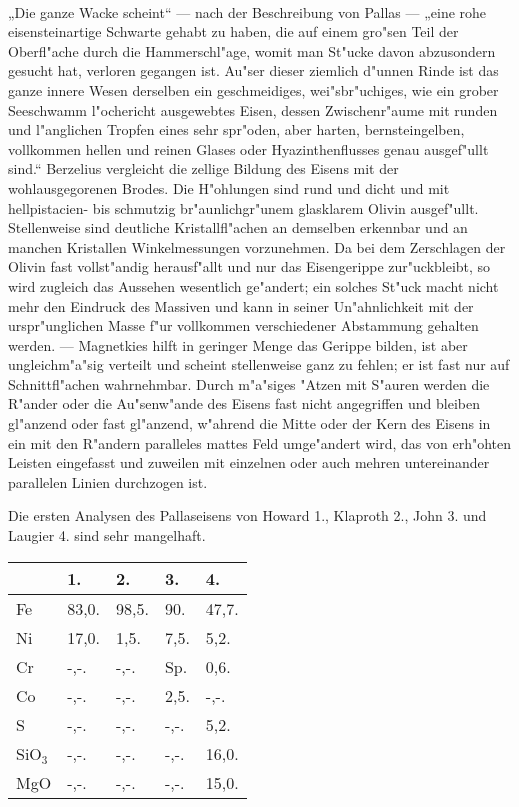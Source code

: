 \documentclass[a4paper, 11pt, oneside]{article}
\begin{document}
\paragraph{}
„Die ganze Wacke scheint“ --- nach der Beschreibung von Pallas --- „eine rohe eisensteinartige Schwarte gehabt zu haben, die auf einem gro"sen Teil der Oberfl"ache durch die Hammerschl"age, womit man St"ucke davon abzusondern gesucht hat, verloren gegangen ist. Au"ser dieser ziemlich d"unnen Rinde ist das ganze innere Wesen derselben ein geschmeidiges, wei"sbr"uchiges, wie ein grober Seeschwamm l"ochericht ausgewebtes Eisen, dessen Zwischenr"aume mit runden und l"anglichen Tropfen eines sehr spr"oden, aber harten, bernsteingelben, vollkommen hellen und reinen Glases oder Hyazinthenflusses genau ausgef"ullt sind.“ Berzelius vergleicht die zellige Bildung des Eisens mit der wohlausgegorenen Brodes. Die H"ohlungen sind rund und dicht und mit hellpistacien- bis schmutzig br"aunlichgr"unem glasklarem Olivin ausgef"ullt. Stellenweise sind deutliche Kristallfl"achen an demselben erkennbar und an manchen Kristallen Winkelmessungen vorzunehmen. Da bei dem Zerschlagen der Olivin fast vollst"andig herausf"allt und nur das Eisengerippe zur"uckbleibt, so wird zugleich das Aussehen wesentlich ge"andert; ein solches St"uck macht nicht mehr den Eindruck des Massiven und kann in seiner Un"ahnlichkeit mit der urspr"unglichen Masse f"ur vollkommen verschiedener Abstammung gehalten werden. --- Magnetkies hilft in geringer Menge das Gerippe bilden, ist aber ungleichm"a"sig verteilt und scheint stellenweise ganz zu fehlen; er ist fast nur auf Schnittfl"achen wahrnehmbar. Durch m"a"siges "Atzen mit S"auren werden die R"ander oder die Au"senw"ande des Eisens fast nicht angegriffen und bleiben gl"anzend oder fast gl"anzend, w"ahrend die Mitte oder der Kern des Eisens in ein mit den R"andern paralleles mattes Feld umge"andert wird, das von erh"ohten Leisten eingefasst und zuweilen mit einzelnen oder auch mehren untereinander parallelen Linien durchzogen ist.

Die ersten Analysen des Pallaseisens von Howard 1., Klaproth 2., John 3. und Laugier 4. sind sehr mangelhaft.
\begin{table}[H]
    \centering
    \begin{tabular}{l l l l l}
         & 1. & 2. & 3. & 4. \\ \hline
        Fe & 83,0. & 98,5. & 90. & 47,7. \\
        Ni & 17,0. & 1,5. & 7,5. & 5,2. \\
        Cr & -,-. & -,-. & Sp. & 0,6. \\
        Co & -,-. & -,-. & 2,5. & -,-. \\
        S & -,-. & -,-. & -,-. & 5,2. \\
        SiO$_{3}$ & -,-. & -,-. & -,-. & 16,0. \\
        MgO & -,-. & -,-. & -,-. & 15,0. \\
    \end{tabular}
\end{table}
\end{document}
